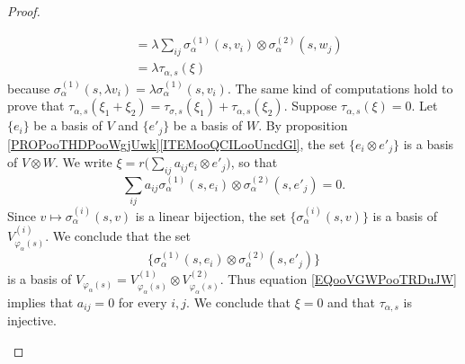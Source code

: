 \begin{proof}
\begin{subproof}
\begin{subproof}
\begin{subequations}
\begin{align}
					                            & =\lambda\sum_{ij}\sigma_{\alpha}^{(1)}(s,v_i)\otimes \sigma_{\alpha}^{(2)}(s,w_j)        \\
					                            & =\lambda\tau_{\alpha,s}(\xi)
				\end{align}
			\end{subequations}
			because \( \sigma_{\alpha}^{(1)}(s,\lambda v_i)=\lambda\sigma_{\alpha}^{(1)}(s,v_i)\). The same kind of computations hold to prove that \( \tau_{\alpha,s}(\xi_1+\xi_2)=\tau_{\sigma,s}(\xi_1)+\tau_{\alpha,s}(\xi_2)\).
			\spitem[Injective]
			Suppose \( \tau_{\alpha,s}(\xi)=0\). Let \( \{e_i\}\) be a basis of \( V\) and \( \{e'_j\}\) be a basis of \( W\). By proposition \ref{PROPooTHDPooWgjUwk}\ref{ITEMooQCILooUncdGl}, the set \( \{e_i\otimes e'_j\}\) is a basis of \( V\otimes W\). We write \( \xi=r\big( \sum_{ij}a_{ij}e_i\otimes e'_j \big)\), so that
			\begin{equation}		\label{EQooVGWPooTRDuJW}
				\sum_{ij}a_{ij}\sigma_{\alpha}^{(1)}(s,e_i)\otimes \sigma_{\alpha}^{(2)}(s,e'_j)=0.
			\end{equation}
			Since \( v\mapsto \sigma_{\alpha}^{(i)}(s,v)\) is a linear bijection, the set \( \{ \sigma_{\alpha}^{(i)}(s,v) \}\) is a basis of \( V_{\varphi_{\alpha}(s)}^{(i)}\). We conclude that the set
			\begin{equation}
				\{ \sigma_{\alpha}^{(1)}(s,e_i)\otimes \sigma_{\alpha}^{(2)}(s,e'_j) \}
			\end{equation}
			is a basis of \( V_{\varphi_{\alpha}(s)}=V_{\varphi_{\alpha}(s)}^{(1)}\otimes V_{\varphi_{\alpha}(s)}^{(2)}\). Thus equation \eqref{EQooVGWPooTRDuJW} implies that \( a_{ij}=0\) for every \( i,j\). We conclude that \( \xi=0\) and that \( \tau_{\alpha,s}\) is injective.


\end{subproof}
\end{subproof}
\end{proof}
